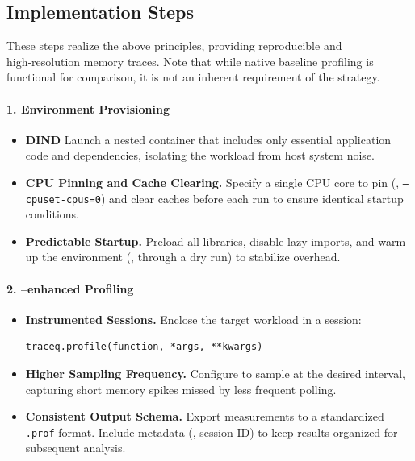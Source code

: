 \subsection{Implementation Steps}
\label{subsec:implementation-steps}

These steps realize the above principles, providing reproducible and high‑resolution memory traces.
Note that while native baseline profiling is functional for comparison, it is not an inherent requirement of the strategy.

\paragraph{1. Environment Provisioning}
\begin{itemize}
    \item \textbf{\ac{DIND}} Launch a nested container that includes only essential application code and dependencies, isolating the workload from host system noise.
    \item \textbf{\ac{CPU} Pinning and Cache Clearing.} Specify a single \ac{CPU} core to pin (\eg, \texttt{--cpuset-cpus=0}) and clear caches before each run to ensure identical startup conditions.
    \item \textbf{Predictable Startup.} Preload all libraries, disable lazy imports, and warm up the environment (\eg, through a dry run) to stabilize overhead.
\end{itemize}

\paragraph{2. \traceq–enhanced Profiling}
\begin{itemize}
    \item \textbf{Instrumented Sessions.} Enclose the target workload in a \traceq session:
    \begin{verbatim}
traceq.profile(function, *args, **kwargs)
    \end{verbatim}
    \item \textbf{Higher Sampling Frequency.} Configure \traceq to sample at the desired interval, capturing short memory spikes missed by less frequent polling.
    \item \textbf{Consistent Output Schema.} Export measurements to a standardized \texttt{.prof} format. Include metadata (\eg, session ID) to keep results organized for subsequent analysis.
\end{itemize}

